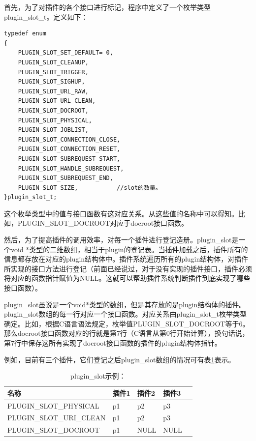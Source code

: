 \documentclass[twoside, xetex]{report}
\begin{document}
	首先，为了对插件的各个接口进行标记，程序中定义了一个枚举类型plugin\_slot\_t。定义如下：
\begin{verbatim}
typedef enum
{
	PLUGIN_SLOT_SET_DEFAULT= 0,
	PLUGIN_SLOT_CLEANUP,
	PLUGIN_SLOT_TRIGGER,
	PLUGIN_SLOT_SIGHUP,
	PLUGIN_SLOT_URL_RAW,
	PLUGIN_SLOT_URL_CLEAN,
	PLUGIN_SLOT_DOCROOT,
	PLUGIN_SLOT_PHYSICAL,
	PLUGIN_SLOT_JOBLIST,
	PLUGIN_SLOT_CONNECTION_CLOSE,
	PLUGIN_SLOT_CONNECTION_RESET,
	PLUGIN_SLOT_SUBREQUEST_START,
	PLUGIN_SLOT_HANDLE_SUBREQUEST,
	PLUGIN_SLOT_SUBREQUEST_END,
	PLUGIN_SLOT_SIZE, 			//slot的数量。
}plugin_slot_t;
\end{verbatim}

	这个枚举类型中的值与接口函数有这对应关系。从这些值的名称中可以得知。比如，PLUGIN\_SLOT\_DOCROOT对应于docroot接口函数。
	
	然后，为了提高插件的调用效率，对每一个插件进行登记造册。plugin\_slot是一个void *类型的二维数组，相当于plugin的登记表。当插件加载之后，插件所有的信息都存放在对应的plugin结构体中。插件系统遍历所有的plugin结构体，对插件所实现的接口方法进行登记（前面已经说过，对于没有实现的插件接口，插件必须将对应的函数指针赋值为NULL。这就可以帮助插件系统判断插件到底实现了哪些接口函数）。
	
	plugin\_slot虽说是一个void*类型的数组，但是其存放的是plugin结构体的插件。plugin\_slot数组的每一行对应一个接口函数。对应关系由plugin\_slot\_t枚举类型确定。比如，根据C语言语法规定，枚举值PLUGIN\_SLOT\_DOCROOT等于6。那么docroot接口函数对应的行就是第7行（C语言从第0行开始计算），换句话说，第7行中保存这所有实现了docroot接口函数的插件的plugin结构体指针。
	
	例如，目前有三个插件，它们登记之后plugin\_slot数组的情况可有表\ref{example_plugin}表示。
	\begin{table}[htbp]
	\caption{plugin\_slot示例：}
	\label{example_plugin}
	\centering
	\begin{tabularx}{\textwidth}{p{6cm}XXXl} %
	\toprule
	\centering 名称 & \centering  插件1 & \centering  插件2 &\centering 插件3&\\
	\midrule
	\centering PLUGIN\_SLOT\_PHYSICAL &\centering  p1 &\centering  p2 &\centering  p3&\\
	\centering PLUGIN\_SLOT\_URI\_CLEAN &\centering  p1 &\centering  p2 &\centering  p3&\\
	\centering PLUGIN\_SLOT\_DOCROOT &\centering  p1 & \centering NULL & \centering NULL&\\
	\bottomrule
	\end{tabularx}
	\end{table}
	
\end{document}
